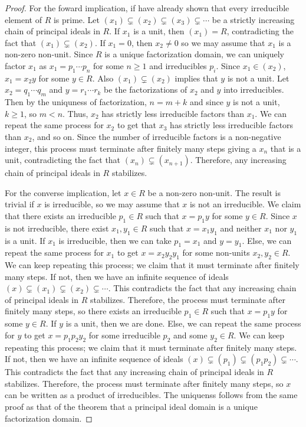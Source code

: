 \begin{proof}
    For the foward implication, if have already shown that every irreducible element of $R$ is prime. Let $(x_{1}) \subsetneq (x_{2}) \subsetneq (x_{3}) \subsetneq \cdots$ be a strictly increasing chain of principal ideals in $R$. If $x_{1}$ is a unit, then $(x_{1}) = R$, contradicting the fact that $(x_{1}) \subsetneq (x_{2})$. If $x_{1} = 0$, then $x_{2} \neq 0$ so we may assume that $x_{1}$ is a non-zero non-unit. Since $R$ is a unique factorization domain, we can uniquely factor $x_{1}$ as $x_{1} = p_{1} \cdots p_{n}$ for some $n \geq 1$ and irreducibles $p_{i}$. Since $x_{1} \in (x_{2})$, $x_{1} = x_{2}y$ for some $y \in R$. Also $(x_{1}) \subsetneq (x_{2})$ implies that $y$ is not a unit. Let $x_{2} = q_{1} \cdots q_{m}$ and $y = r_{1} \cdots r_{k}$ be the factorizations of $x_{2}$ and $y$ into irreducibles. Then by the uniquness of factorization, $n = m+k$ and since $y$ is not a unit, $k \geq 1$, so $m < n$. Thus, $x_{2}$ has strictly less irreducible factors than $x_{1}$. We can repeat the same process for $x_{2}$ to get that $x_{3}$ has strictly less irreducible factors than $x_{2}$, and so on. Since the number of irreducible factors is a non-negative integer, this process must terminate after finitely many steps giving a $x_{n}$ that is a unit, contradicting the fact that $(x_{n}) \subsetneq (x_{n+1})$. Therefore, any increasing chain of principal ideals in $R$ stabilizes.

    For the converse implication, let $x \in R$ be a non-zero non-unit. The result is trivial if $x$ is irreducible, so we may assume that $x$ is not an irreducible. We claim that there exists an irreducible $p_{1} \in R$ such that $x = p_{1}y$ for some $y \in R$. Since $x$ is not irreducible, there exist $x_{1},y_{1} \in R$ such that $x = x_{1}y_{1}$ and neither $x_{1}$ nor $y_{1}$ is a unit. If $x_{1}$ is irreducible, then we can take $p_{1} = x_{1}$ and $y = y_{1}$. Else, we can repeat the same process for $x_{1}$ to get $x = x_{2}y_{2}y_{1}$ for some non-units $x_{2},y_{2} \in R$. We can keep repeating this process; we claim that it must terminate after finitely many steps. If not, then we have an infinite sequence of ideals $(x) \subsetneq (x_{1}) \subsetneq (x_{2}) \subsetneq \cdots$. This contradicts the fact that any increasing chain of principal ideals in $R$ stabilizes. Therefore, the process must terminate after finitely many steps, so there exists an irreducible $p_{1} \in R$ such that $x = p_{1}y$ for some $y \in R$. If $y$ is a unit, then we are done. Else, we can repeat the same process for $y$ to get $x = p_{1}p_{2}y_{2}$ for some irreducible $p_{2}$ and some $y_{2} \in R$. We can keep repeating this process; we claim that it must terminate after finitely many steps. If not, then we have an infinite sequence of ideals $(x) \subsetneq (p_{1}) \subsetneq (p_{1}p_{2}) \subsetneq \cdots$. This contradicts the fact that any increasing chain of principal ideals in $R$ stabilizes. Therefore, the process must terminate after finitely many steps, so $x$ can be written as a product of irreducibles. The uniquenss follows from the same proof as that of the theorem that a principal ideal domain is a unique factorization domain.
\end{proof}

